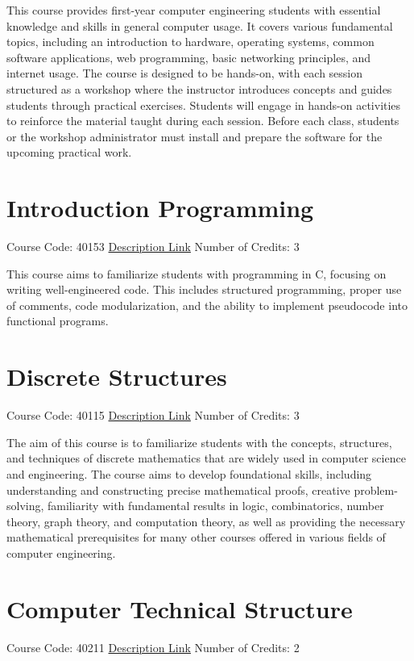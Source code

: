 \documentclass[
fontsize=11pt,
paper=a4,
parskip=half,
enlargefirstpage=off,    %
fromalign=right,        %
fromphone=on,           %
fromemail=on,
fromrule=off,           %
addrfield=off,          %
backaddress=on,         %
subject=beforeopening,  %
locfield=narrow,        %
foldmarks=off,          %
open=any
]{scrartcl}
\begin{document}
This course provides first-year computer engineering students with essential knowledge and skills in general computer usage. It covers various fundamental topics, including an introduction to hardware, operating systems, common software applications, web programming, basic networking principles, and internet usage. The course is designed to be hands-on, with each session structured as a workshop where the instructor introduces concepts and guides students through practical exercises. Students will engage in hands-on activities to reinforce the material taught during each session. Before each class, students or the workshop administrator must install and prepare the software for the upcoming practical work.

\section{Introduction Programming}
Course Code: 40153 \qquad \quad \href{https://docs.ce.sharif.edu/course/40153}{Description Link}
\qquad \quad Number of Credits: 3

This course aims to familiarize students with programming in C, focusing on writing well-engineered code. This includes structured programming, proper use of comments, code modularization, and the ability to implement pseudocode into functional programs.

\section{Discrete Structures}
Course Code: 40115 \qquad \quad \href{https://docs.ce.sharif.edu/course/40115}{Description Link}
\qquad \quad Number of Credits: 3

The aim of this course is to familiarize students with the concepts, structures, and techniques of discrete mathematics that are widely used in computer science and engineering. The course aims to develop foundational skills, including understanding and constructing precise mathematical proofs, creative problem-solving, familiarity with fundamental results in logic, combinatorics, number theory, graph theory, and computation theory, as well as providing the necessary mathematical prerequisites for many other courses offered in various fields of computer engineering.

\section{Computer Technical Structure}
Course Code: 40211 \qquad \quad \href{https://docs.ce.sharif.edu/course/40211}{Description Link}
\qquad \quad Number of Credits: 2
\end{document}
